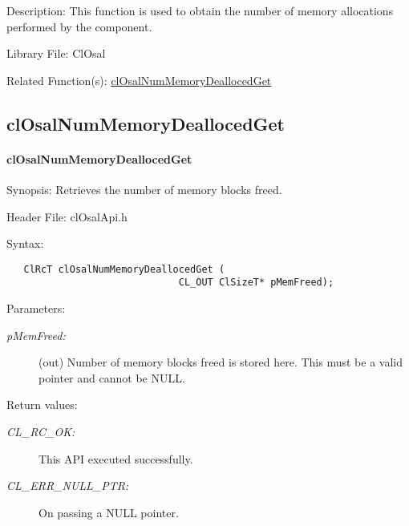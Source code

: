 \begin{Desc}
\item[Description:]This function is used to obtain the number of memory allocations performed by the component.\end{Desc}
\begin{Desc}
\item[Library File:]Cl\-Osal\end{Desc}
\begin{Desc}
\item[Related Function(s):]\hyperlink{pageosal117}{cl\-Osal\-Num\-Memory\-Dealloced\-Get} \end{Desc}

\newpage
\subsection{clOsalNumMemoryDeallocedGet}
\hypertarget{pageosal117}{}\paragraph{cl\-Osal\-Num\-Memory\-Dealloced\-Get}\label{pageosal117}
\begin{Desc}
\item[Synopsis:]Retrieves the number of memory blocks freed.\end{Desc}
\begin{Desc}
\item[Header File:]clOsalApi.h\end{Desc}
\begin{Desc}
\item[Syntax:]

\footnotesize\begin{verbatim}   ClRcT clOsalNumMemoryDeallocedGet (
                              CL_OUT ClSizeT* pMemFreed);
\end{verbatim}
\normalsize
\end{Desc}
\begin{Desc}
\item[Parameters:]
\begin{description}
\item[{\em p\-Mem\-Freed:}](out) Number of memory blocks freed is stored here. This must be a valid pointer and cannot be NULL.\end{description}
\end{Desc}
\begin{Desc}
\item[Return values:]
\begin{description}
\item[{\em CL\_\-RC\_\-OK:}]This API executed successfully. \item[{\em CL\_\-ERR\_\-NULL\_\-PTR:}]On passing a NULL pointer.\end{description}
\end{Desc}
